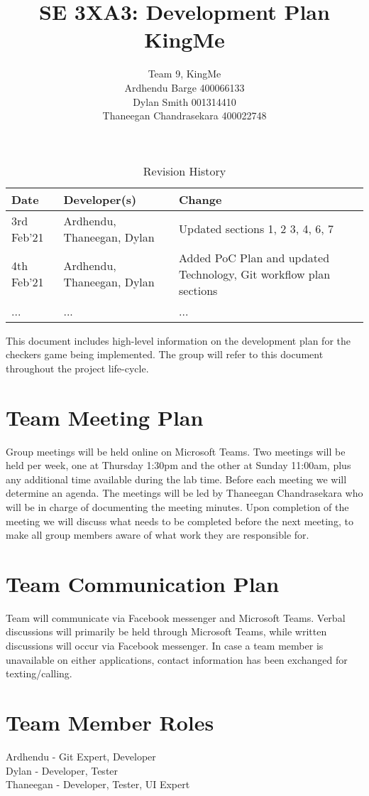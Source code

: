 \documentclass{article}
\title{SE 3XA3: Development Plan\\KingMe}
\author{Team 9, KingMe
		\\ Ardhendu Barge 400066133
		\\ Dylan Smith 001314410
		\\ Thaneegan Chandrasekara 400022748
}
\date{}
\begin{document}
\begin{table}[hp]
\caption{Revision History} \label{TblRevisionHistory}
\begin{tabularx}{\textwidth}{llX}
\toprule
\textbf{Date} & \textbf{Developer(s)} & \textbf{Change}\\
\midrule
3rd Feb'21 & Ardhendu, Thaneegan, Dylan & Updated sections 1, 2 3, 4, 6, 7\\
4th Feb'21 & Ardhendu, Thaneegan, Dylan & Added PoC Plan and updated Technology, Git workflow plan sections\\
... & ... & ...\\
\bottomrule
\end{tabularx}
\end{table}

\newpage

\maketitle

This document includes high-level information on the development plan for the checkers game being implemented. The group will refer to this document throughout the project life-cycle.

\section{Team Meeting Plan}
Group meetings will be held online on Microsoft Teams. Two meetings will be held per week, one at Thursday 1:30pm and the other at Sunday 11:00am, plus any additional time available during the lab time. Before each meeting we will determine an agenda. The meetings will be led by Thaneegan Chandrasekara who will be in charge of documenting the meeting minutes. Upon completion of the meeting we will discuss what needs to be completed before the next meeting, to make all group members aware of what work they are responsible for.

\section{Team Communication Plan}
Team will communicate via Facebook messenger and Microsoft Teams. Verbal discussions will primarily be held through Microsoft Teams, while written discussions will occur via Facebook messenger. In case a team member is unavailable on either applications, contact information has been exchanged for texting/calling. 

\section{Team Member Roles}
Ardhendu - Git Expert, Developer\\ 
Dylan - Developer, Tester \\
Thaneegan - Developer, Tester, UI Expert
\end{document}
